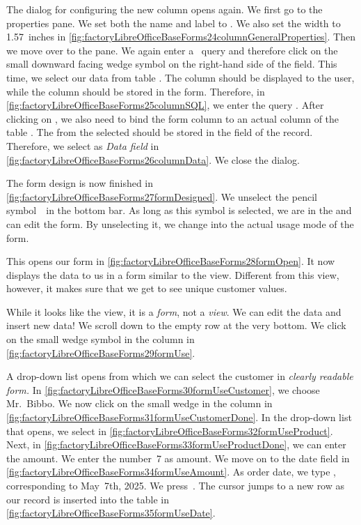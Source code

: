 The dialog for configuring the new column opens again.
We first go to the  properties pane.
We set both the name and label to .
We also set the width to 1.57~inches in \cref{fig:factoryLibreOfficeBaseForms24columnGeneralProperties}.
Then we move over to the  pane.
We again enter a \sql\ query and therefore click on the small downward facing wedge symbol on the right-hand side of the  field.
This time, we select our data from table .
The  column should be displayed to the user, while the  column should be stored in the form.
Therefore, in \cref{fig:factoryLibreOfficeBaseForms25columnSQL}, we enter the query .
After clicking on , we also need to bind the form column to an actual column of the table .
The  from the selected  should be stored in the  field of the  record.
Therefore, we select  as \emph{Data field} in \cref{fig:factoryLibreOfficeBaseForms26columnData}.
We close the dialog.

The form design is now finished in \cref{fig:factoryLibreOfficeBaseForms27formDesigned}.
We unselect the pencil symbol~\libreOfficeBaseDesignMode\ in the bottom bar.
As long as this symbol is selected, we are in the  and can edit the form.
By unselecting it, we change into the actual usage mode of the form.

This opens our form in \cref{fig:factoryLibreOfficeBaseForms28formOpen}.
It now displays the data to us in a form similar to the  view.
Different from this view, however, it makes sure that we get to see unique customer values.

While it looks like the  view, it is a \emph{form}, not a \emph{view}.
We can edit the data and insert new data!
We scroll down to the empty row at the very bottom.
We click on the small wedge symbol in the  column in \cref{fig:factoryLibreOfficeBaseForms29formUse}.

A drop-down list opens from which we can select the customer in \emph{clearly readable form.} %
In \cref{fig:factoryLibreOfficeBaseForms30formUseCustomer}, we choose Mr.~Bibbo.
We now click on the small wedge in the  column in \cref{fig:factoryLibreOfficeBaseForms31formUseCustomerDone}.
In the drop-down list that opens, we select  in \cref{fig:factoryLibreOfficeBaseForms32formUseProduct}.
Next, in \cref{fig:factoryLibreOfficeBaseForms33formUseProductDone}, we can enter the amount.
We enter the number~7 as amount.
We move on to the  date field in \cref{fig:factoryLibreOfficeBaseForms34formUseAmount}.
As order date, we type , corresponding to May~7th, 2025.
We press~\keys{\tab}.
The cursor jumps to a new row as our record is inserted into the  table in \cref{fig:factoryLibreOfficeBaseForms35formUseDate}.

